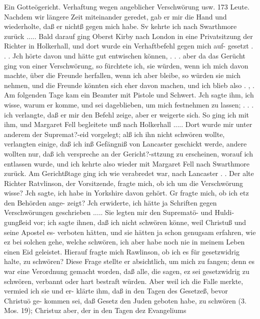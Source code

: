 Ein Gotteögericht. Verhaftung wegen angeblicher Verschwörung usw. 173
Leute. Nachdem wir längere Zeit miteinander geredet, gab er
mir die Hand und wiederholte, daß er nichtß gegen mich habe.
Sv kehrte ich nach Swarthmore zurück ..... Bald darauf
ging Oberst Kirby nach London in eine Privatsitzung der Richter
in Holkerhall, und dort wurde ein Verhaftbefehl gegen mich auf-
gesetzt . . . Jch hörte davon und hätte gut entwischen können, . . .
aber da das Gerücht ging von einer Verschwörung, so fürchtete
ich, sie würden, wenn ich mich davon machte, über die Freunde
herfallen, wenn ich aber bleibe, so würden sie mich nehmen, und
die Freunde könnten sich eher davon machen, und ich blieb also . , .
Am folgenden Tage kam ein Beamter mit Pistole und Schwert.
Jch sagte ihm, ich wisse, warum er komme, und sei dageblieben,
um mich festnehmen zu lassen; . . . ich verlangte, daß er mir den
Befehl zeige, aber er weigerte sich. So ging ich mit ihm, und
Margaret Fell begleitete unß nach Holkerhall ..... Dort wurde
mir unter anderem der Supremat?-eid vorgelegt; alß ich ihn nicht
schwören wollte, verlangten einige, daß ich inß Gefängniß von
Lancaster geschickt werde, andere wollten nur, daß ich verspreche
an der Gericht?-sttzung zu erscheinen, worauf ich entlassen wurde,
und ich kehrte also wieder mit Margaret Fell nach Swarthmore
zurück.
Am Gerichtßtage ging ich wie verabredet war, nach Lancaster . .
Der alte Richter Ratvlinson, der Vorsitzende, fragte mich, ob ich
um die Verschwörung wisse? Jch sagte, ich habe in Yorkshire
davon gehört. Gr fragte mich, ob ich etz den Behörden ange-
zeigt? Jch erwiderte, ich hätte ja Schriften gegen Verschwörungen
geschrieben ..... Sie legten mir den Suprematö- und Huldi-
gungßeid vor; ich sagte ihnen, daß ich nicht schwören könne, weil
Christuß und seine Apostel es- verboten hätten, und sie hätten ja
schon genugsam erfahren, wie ez bei solchen gehe, welche schwören,
ich aber habe noch nie in meinem Leben einen Eid geleistet. Hierauf
fragte mich Rawlinson, ob ich es für gesetzwidrig halte, zu
schwören? Diese Frage stellte er absichtlich, um mich zu fangen;
denn es war eine Verordnung gemacht worden, daß alle, die
sagen, ez sei gesetzwidrig zu schwören, verbannt oder hart bestraft
würden. Aber weil ich die Falle merkte, vermied ich sie und er-
klärte ihm, daß in den Tagen des Gesetzeß, bevor Christuö ge-
kommen sei, daß Gesetz den Juden geboten habe, zu schwören
(3. Mos. 19); Christuz aber, der in den Tagen dez Evangeliums


